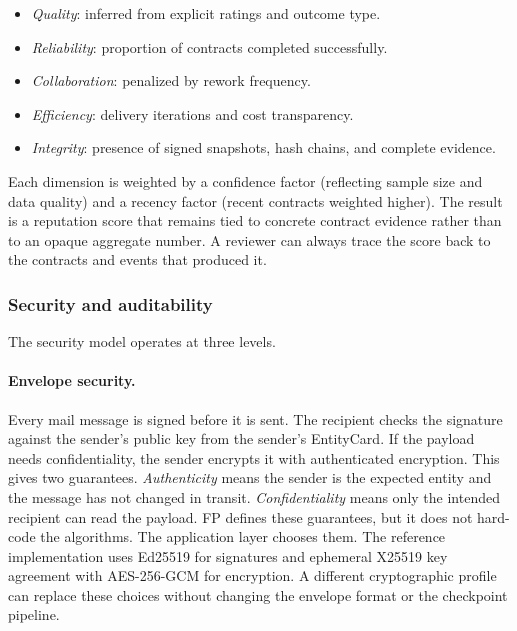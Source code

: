 \documentclass{llmxive}
\begin{document}
\begin{itemize}[nosep]
    \item \emph{Quality}: inferred from explicit ratings and outcome
      type.
    \item \emph{Reliability}: proportion of contracts completed
      successfully.
    \item \emph{Collaboration}: penalized by rework frequency.
    \item \emph{Efficiency}: delivery iterations and cost transparency.
    \item \emph{Integrity}: presence of signed snapshots, hash chains,
      and complete evidence.
\end{itemize}

\noindent Each dimension is weighted by a confidence factor (reflecting
sample size and data quality) and a recency factor (recent contracts
weighted higher).  The result is a reputation score that remains tied to concrete contract evidence rather than to an opaque aggregate number. A reviewer can always trace the score back to the contracts and events that produced it.

\subsubsection{Security and auditability}

The security model operates at three levels.

\paragraph{Envelope security.}
Every mail message is signed before it is sent. The recipient checks the signature against the sender's public key from the sender's EntityCard. If the payload needs confidentiality, the sender encrypts it with authenticated encryption.
This gives two guarantees. \emph{Authenticity} means the sender is the expected entity and the message has not changed in transit. \emph{Confidentiality} means only the intended recipient can read the payload.
FP defines these guarantees, but it does not hard-code the algorithms. The application layer chooses them. The reference implementation uses Ed25519 for signatures and ephemeral X25519 key agreement with AES-256-GCM for encryption. A different cryptographic profile can replace these choices without changing the envelope format or the checkpoint pipeline.
\end{document}

